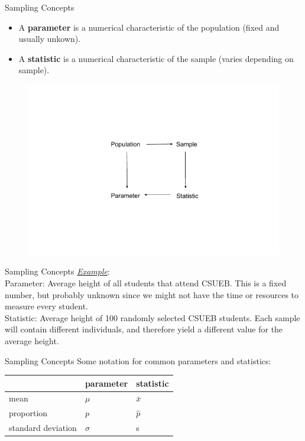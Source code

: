 \documentclass[10pt]{beamer}
\begin{document}
\begin{frame}{Sampling Concepts}
\begin{itemize}
\item A \textbf{parameter} is a numerical characteristic of the population (fixed and usually unkown). 
\item A \textbf{statistic} is a numerical characteristic of the sample (varies depending on sample). \\
\end{itemize}
\begin{figure}
\includegraphics[scale=0.75]{figure/inference.pdf}
\end{figure}
\end{frame}

\begin{frame}{Sampling Concepts}
\emph{\underline{Example}}:\\ 
Parameter: Average height of all students that attend CSUEB.  This is a fixed number, but probably unknown since we might not have the time or resources to measure every student.\\
\vspace{10pt}
Statistic: Average height of 100 randomly selected CSUEB students.  Each sample will contain different individuals, and therefore yield a different value for the average height.\\
\end{frame}

\begin{frame}{Sampling Concepts}
Some notation for common parameters and statistics:\\
\vspace{10pt}

\begin{tabular}{|l|l|l|}
\hline
& parameter & statistic\\
\hline
mean & $\mu$ & $\bar{x}$\\
proportion & $p$ & $\hat{p}$\\
standard deviation & $\sigma$ & s\\
\hline
\end{tabular}
\end{frame}
\end{document}
